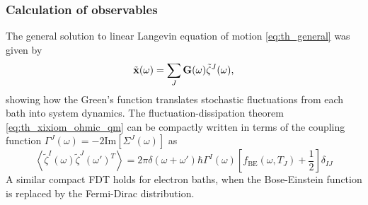 \subsubsection{Calculation of observables}

The general solution to linear Langevin equation of motion \eqref{eq:th_general} was given by
\begin{equation}
 \tilde{\mathbf{x}}(\omega)  = \sum_J \mathbf{G}(\omega)\tilde \zeta^J(\omega), 
\end{equation}
showing how the Green's function translates stochastic fluctuations from each bath into system dynamics. The fluctuation-dissipation theorem \eqref{eq:th_xixiom_ohmic_qm} can be compactly written in terms of the coupling function $\Gamma^J(\omega)=-2\textrm{Im}[\Sigma^J(\omega)]$ as 
\begin{equation}
 \left\langle\tilde \zeta^I(\omega)\tilde \zeta^J(\omega')^T \right\rangle = 2\pi \delta(\omega+\omega') \hbar \Gamma^I(\omega) \left[f_{\textrm{BE}}(\omega,T_J)+ \frac{1}{2} \right] \delta_{IJ} \label{eq:th_zetazeta}
\end{equation}
A similar compact FDT holds for electron baths, when the Bose-Einstein function is replaced by the Fermi-Dirac distribution.

